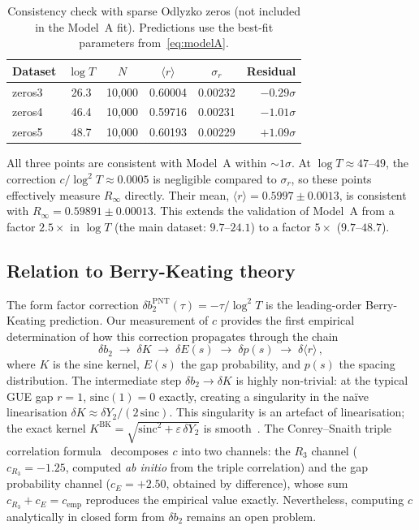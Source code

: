 \documentclass[11pt]{article}
\theoremstyle{plain}
\theoremstyle{remark}
\begin{document}
\begin{table}[ht]
\centering
\caption{Consistency check with sparse Odlyzko zeros (not included in
the Model~A fit). Predictions use the best-fit parameters
from~\eqref{eq:modelA}.}
\label{tab:sparse}
\begin{tabular}{lccccr}
\toprule
Dataset & $\log T$ & $N$ & $\langle r\rangle$ & $\sigma_r$ & Residual \\
\midrule
zeros3 & 26.3 & 10{,}000 & 0.60004 & 0.00232 & $-0.29\sigma$ \\
zeros4 & 46.4 & 10{,}000 & 0.59716 & 0.00231 & $-1.01\sigma$ \\
zeros5 & 48.7 & 10{,}000 & 0.60193 & 0.00229 & $+1.09\sigma$ \\
\bottomrule
\end{tabular}
\end{table}

All three points are consistent with Model~A within $\sim\!1\sigma$.
At $\log T \approx 47$--$49$, the correction $c/\log^2 T \approx 0.0005$
is negligible compared to $\sigma_r$, so these points effectively measure
$R_\infty$ directly. Their mean, $\langle r\rangle = 0.5997 \pm 0.0013$,
is consistent with $R_\infty = 0.59891 \pm 0.00013$. This extends the
validation of Model~A from a factor $2.5\times$ in $\log T$ (the main
dataset: $9.7$--$24.1$) to a factor $5\times$ ($9.7$--$48.7$).

\subsection{Relation to Berry-Keating theory}

The form factor correction $\delta b_2^{\mathrm{PNT}}(\tau) = -\tau/\log^2 T$
is the leading-order Berry-Keating prediction. Our measurement of $c$
provides the first empirical determination of how this correction
propagates through the chain
\[
  \delta b_2 \;\longrightarrow\; \delta K \;\longrightarrow\;
  \delta E(s) \;\longrightarrow\; \delta p(s) \;\longrightarrow\;
  \delta\langle r\rangle\,,
\]
where $K$ is the sine kernel, $E(s)$ the gap probability, and $p(s)$
the spacing distribution. The intermediate step $\delta b_2 \to \delta K$
is highly non-trivial: at the typical GUE gap $r = 1$,
$\mathrm{sinc}(1) = 0$ exactly, creating a singularity in the na\"ive
linearisation $\delta K \approx \delta Y_2 / (2\,\mathrm{sinc})$.
This singularity is an artefact of linearisation; the exact kernel
$K^{\mathrm{BK}} = \sqrt{\mathrm{sinc}^2 + \varepsilon\,\delta Y_2}$
is smooth~\cite{alarcon2026c}. The Conrey--Snaith triple correlation formula~\cite{alarcon2026b} decomposes $c$ into two channels: the $R_3$ channel ($c_{R_3} = -1.25$, computed \emph{ab initio} from the triple correlation) and the gap probability channel ($c_E = +2.50$, obtained by difference), whose sum $c_{R_3} + c_E = c_{\mathrm{emp}}$ reproduces the empirical value exactly. Nevertheless, computing $c$ analytically in closed form from $\delta b_2$ remains an open problem.
\end{document}
